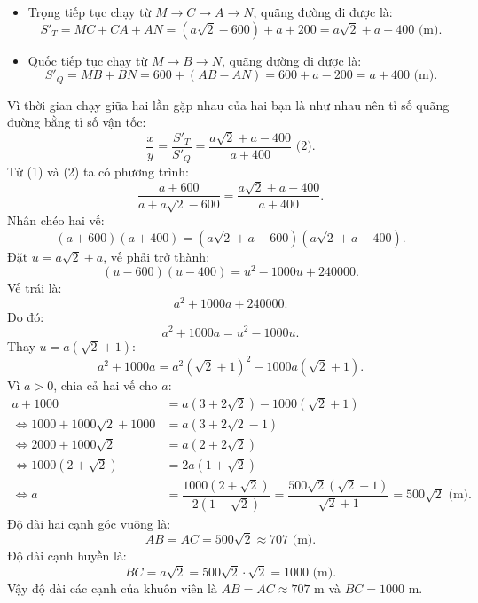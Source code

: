 \begin{bt}
{\begin{enumerate}[a)]
\begin{itemize}
		\item Trọng tiếp tục chạy từ $M \to C \to A \to N$, quãng đường đi được là:
		$$S'_T = MC + CA + AN = (a\sqrt{2} - 600) + a + 200 = a\sqrt{2} + a - 400\text{ (m)}.$$
		\item Quốc tiếp tục chạy từ $M \to B \to N$, quãng đường đi được là:
		$$S'_Q = MB + BN = 600 + (AB - AN) = 600 + a - 200 = a + 400\text{ (m)}.$$
	\end{itemize}
	Vì thời gian chạy giữa hai lần gặp nhau của hai bạn là như nhau nên tỉ số quãng đường bằng tỉ số vận tốc:
	$$\dfrac{x}{y} = \dfrac{S'_T}{S'_Q} = \dfrac{a\sqrt{2} + a - 400}{a + 400}\text{ (2)}.$$
	Từ (1) và (2) ta có phương trình:
	$$\dfrac{a + 600}{a + a\sqrt{2} - 600} = \dfrac{a\sqrt{2} + a - 400}{a + 400}.$$
	Nhân chéo hai vế:
	$$(a + 600)(a + 400) = (a\sqrt{2} + a - 600)(a\sqrt{2} + a - 400).$$
	Đặt $u = a\sqrt{2} + a$, vế phải trở thành:
	$$(u - 600)(u - 400) = u^2 - 1000u + 240000.$$
	Vế trái là:
	$$a^2 + 1000a + 240000.$$
	Do đó:
	$$a^2 + 1000a = u^2 - 1000u.$$
	Thay $u = a(\sqrt{2} + 1)$:
	$$a^2 + 1000a = a^2(\sqrt{2} + 1)^2 - 1000a(\sqrt{2} + 1).$$
	Vì $a > 0$, chia cả hai vế cho $a$:
	\begin{align*}
		a + 1000 &= a(3 + 2\sqrt{2}) - 1000(\sqrt{2} + 1) \\
		\iff 1000 + 1000\sqrt{2} + 1000 &= a(3 + 2\sqrt{2} - 1) \\
		\iff 2000 + 1000\sqrt{2} &= a(2 + 2\sqrt{2}) \\
		\iff 1000(2 + \sqrt{2}) &= 2a(1 + \sqrt{2}) \\
		\iff a &= \dfrac{1000(2 + \sqrt{2})}{2(1 + \sqrt{2})} = \dfrac{500\sqrt{2}(\sqrt{2} + 1)}{\sqrt{2} + 1} = 500\sqrt{2}\text{ (m)}.
	\end{align*}
	Độ dài hai cạnh góc vuông là:
	$$AB = AC = 500\sqrt{2} \approx 707\text{ (m)}.$$
	Độ dài cạnh huyền là:
	$$BC = a\sqrt{2} = 500\sqrt{2} \cdot \sqrt{2} = 1000\text{ (m)}.$$
	Vậy độ dài các cạnh của khuôn viên là $AB = AC \approx 707\text{ m}$ và $BC = 1000\text{ m}$.
\end{enumerate}
}
\end{bt}

